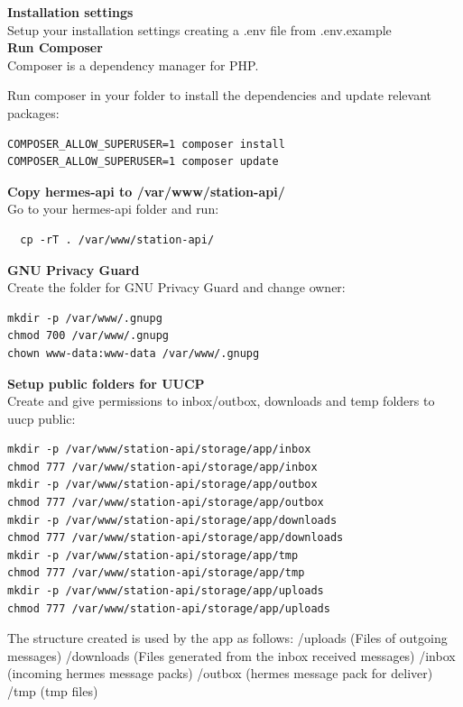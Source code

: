 \textbf{Installation settings}\\

Setup your installation settings creating a .env file from .env.example\\

\textbf{Run Composer}\\

Composer is a dependency manager for PHP.

Run composer in your folder to install the dependencies and update relevant packages:
\begin{verbatim}
COMPOSER_ALLOW_SUPERUSER=1 composer install
COMPOSER_ALLOW_SUPERUSER=1 composer update

\end{verbatim}

\textbf{Copy hermes-api to /var/www/station-api/}\\

Go to your hermes-api folder and run:
\begin{verbatim}
  cp -rT . /var/www/station-api/
\end{verbatim}

\textbf{GNU Privacy Guard}\\

Create the folder for GNU Privacy Guard and change owner:
\begin{verbatim}
mkdir -p /var/www/.gnupg
chmod 700 /var/www/.gnupg
chown www-data:www-data /var/www/.gnupg
\end{verbatim}

\textbf{Setup public folders for UUCP}\\

Create and give permissions to inbox/outbox, downloads and temp folders to uucp public:
\begin{verbatim}
mkdir -p /var/www/station-api/storage/app/inbox
chmod 777 /var/www/station-api/storage/app/inbox
mkdir -p /var/www/station-api/storage/app/outbox
chmod 777 /var/www/station-api/storage/app/outbox
mkdir -p /var/www/station-api/storage/app/downloads
chmod 777 /var/www/station-api/storage/app/downloads
mkdir -p /var/www/station-api/storage/app/tmp
chmod 777 /var/www/station-api/storage/app/tmp
mkdir -p /var/www/station-api/storage/app/uploads
chmod 777 /var/www/station-api/storage/app/uploads
\end{verbatim}

The structure created is used by the app as follows:
/uploads (Files of outgoing messages)
/downloads (Files generated from the inbox received messages)
/inbox (incoming hermes message packs)
/outbox (hermes message pack for deliver)
/tmp (tmp files)\\

